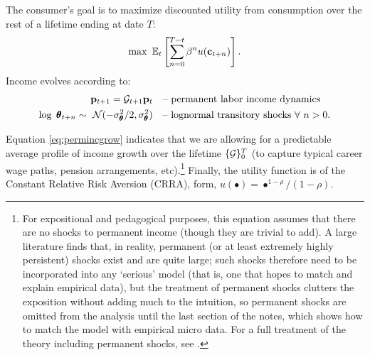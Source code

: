 \documentclass[titlepage, headings=optiontotocandhead]{econtex}
\begin{document}
The consumer's goal is to maximize discounted utility from consumption over the rest of a lifetime ending at date $T$:
  \begin{equation}\label{eq:MaxProb}
    \max~{\mathbb{E}}_{t}\left[\sum_{n=0}^{T-t}\beta^{n} u(\mathbf{c}_{t+n})\right].
  \end{equation}
Income evolves according to:
  \begin{equation}\begin{gathered}\begin{aligned}
        \mathbf{p}_{t+1}   = \mathcal{G}_{t+1}\mathbf{p}_{t}                                        & \text{~~ -- permanent labor income dynamics} \label{eq:permincgrow}
        \\ \log ~ \pmb{\theta}_{t+n}  \sim ~\mathcal{N}(-\sigma_{\pmb{\theta}}^{2}/2,\sigma_{\pmb{\theta}}^{2}) & \text{~~ -- lognormal transitory shocks}~\forall~n>0 .
      \end{aligned}\end{gathered}\end{equation}

Equation \eqref{eq:permincgrow} indicates that we are allowing for a predictable average profile of income growth over the lifetime $\{\mathcal{G}\}_{0}^{T}$ (to capture typical career wage paths, pension arrangements, etc).\footnote{For expositional and pedagogical purposes, this equation assumes that there are no shocks to permanent income (though they are trivial to add).  A large literature finds that, in reality, permanent (or at least extremely highly persistent) shocks exist and are quite large; such shocks therefore need to be incorporated into any `serious' model (that is, one that hopes to match and explain empirical data), but the treatment of permanent shocks clutters the exposition without adding much to the intuition, so permanent shocks are omitted from the analysis until the last section of the notes, which shows how to match the model with empirical micro data.  For a full treatment of the theory including permanent shocks, see \cite{BufferStockTheory}.}  Finally, the utility function is of the Constant Relative Risk Aversion (CRRA), form, $u(\bullet) = \bullet^{1-\rho}/(1-\rho)$.
\end{document}
